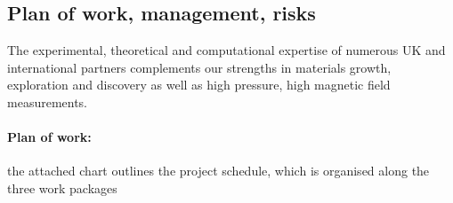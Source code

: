 \subsection*{Plan of work, management,
risks}
\noindent
The experimental, theoretical and computational expertise of numerous UK and international partners complements our strengths in materials growth, exploration and discovery as well as high pressure, high magnetic field measurements. 



\paragraph{Plan of work:} the attached chart outlines the project schedule, which is organised along the three work packages 

